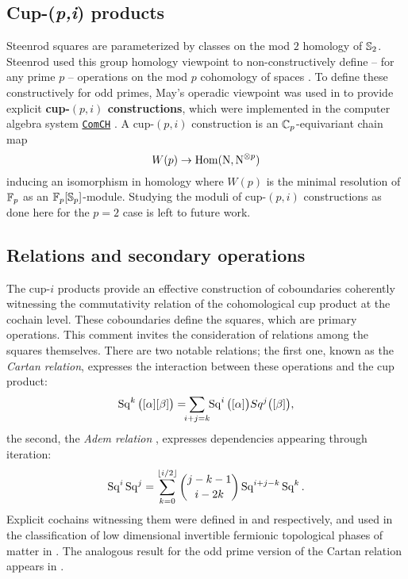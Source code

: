 \subsection{Cup-(\textit{p,i}) products}

Steenrod squares are parameterized by classes on the mod $2$ homology of $\mathbb{S}_2$.
Steenrod used this group homology viewpoint to non-constructively define -- for any prime $p$ -- operations on the mod $p$ cohomology of spaces \cite{steenrod1952reduced, steenrod1953cyclic}.
To define these constructively for odd primes, May's operadic viewpoint \cite{may1970general} was used in \cite{medina2021may_st} to provide explicit \textbf{cup-$(p,i)$ constructions}, which were implemented in the computer algebra system \href{https://github.com/ammedmar/comch}{\texttt{ComCH}} \cite{medina2021comch}.
A \mbox{cup-$(p,i)$} construction is an $\mathbb{C}_p$-equivariant chain map
\[
W(p) \to \mathrm{Hom}(\operatorname{N}, \operatorname{N}^{\otimes p})
\]
inducing an isomorphism in homology where $W(p)$
is the minimal resolution of ${\mathbb{F}_p}$ as an ${\mathbb{F}_p}[\mathbb{S}_p]$-module.
Studying the moduli of cup-$(p,i)$ constructions as done here for the $p = 2$ case is left to future work.

\subsection{Relations and secondary operations}

The cup-$i$ products provide an effective construction of coboundaries coherently witnessing the commutativity relation of the cohomological cup product at the cochain level.
These coboundaries define the squares, which are primary operations.
This comment invites the consideration of relations among the squares themselves.
There are two notable relations;
the first one, known as the \textit{Cartan relation}, expresses the interaction between these operations and the cup product:
\begin{equation*}
	\Sq^k \big( [\alpha] [\beta] \big) =
	\sum_{\mathclap{i+j=k}} \, \Sq^i\big([\alpha]\big) Sq^j\big([\beta]\big),
\end{equation*}
the second, the \textit{Adem relation} \cite{adem1952iteration}, expresses dependencies appearing through iteration:
\begin{equation*}
	\operatorname{Sq}^i \operatorname{Sq}^j =
	\sum_{k=0}^{\lfloor i/2 \rfloor} \binom{j-k-1}{i-2k} \operatorname{Sq}^{i+j-k} \operatorname{Sq}^k.
\end{equation*}
Explicit cochains witnessing them were defined in \cite{medina2020cartan} and \cite{medina2021adem} respectively, and used in the classification of low dimensional invertible fermionic topological phases of matter in \cite{kapustin2017fermionic, barkeshli2021classification}.
The analogous result for the odd prime version of the Cartan relation appears in \cite{medina2023oddcartan}.

